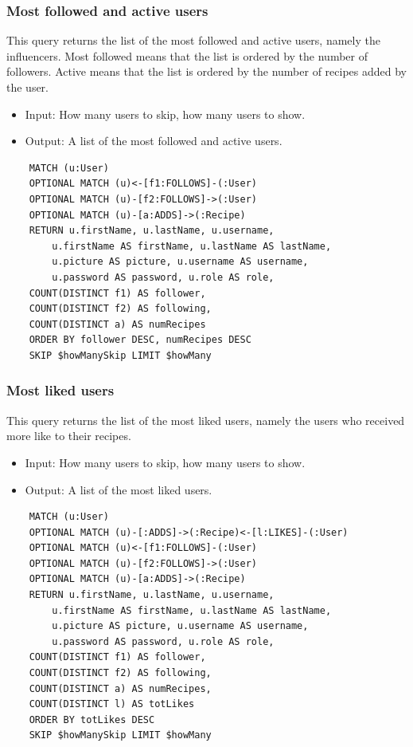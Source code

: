 \documentclass[a4paper]{report}
\begin{document}
\subsubsection{Most followed and active users}
This query returns the list of the most followed and active users, namely the influencers.
Most followed means that the list is ordered by the number of followers.
Active means that the list is ordered by the number of recipes added by the user.
\begin{itemize}
	\item Input: How many users to skip, how many users to show.
	\item Output: A list of the most followed and active users.
\end{itemize}
\lstset{ language=java}
\begin{lstlisting}
	MATCH (u:User)
	OPTIONAL MATCH (u)<-[f1:FOLLOWS]-(:User)
	OPTIONAL MATCH (u)-[f2:FOLLOWS]->(:User)
	OPTIONAL MATCH (u)-[a:ADDS]->(:Recipe)
	RETURN u.firstName, u.lastName, u.username, 
		u.firstName AS firstName, u.lastName AS lastName, 
		u.picture AS picture, u.username AS username,
		u.password AS password, u.role AS role,
	COUNT(DISTINCT f1) AS follower,
	COUNT(DISTINCT f2) AS following,
	COUNT(DISTINCT a) AS numRecipes
	ORDER BY follower DESC, numRecipes DESC
	SKIP $howManySkip LIMIT $howMany
\end{lstlisting}
\subsubsection{Most liked users}
This query returns the list of the most liked users, namely the users who received more like to their recipes.
\begin{itemize}
	\item Input: How many users to skip, how many users to show.
	\item Output: A list of the most liked users.
\end{itemize}
\lstset{ language=java}
\begin{lstlisting}
	MATCH (u:User)
	OPTIONAL MATCH (u)-[:ADDS]->(:Recipe)<-[l:LIKES]-(:User)
	OPTIONAL MATCH (u)<-[f1:FOLLOWS]-(:User)
	OPTIONAL MATCH (u)-[f2:FOLLOWS]->(:User) 
	OPTIONAL MATCH (u)-[a:ADDS]->(:Recipe)
	RETURN u.firstName, u.lastName, u.username, 
		u.firstName AS firstName, u.lastName AS lastName, 
		u.picture AS picture, u.username AS username, 
		u.password AS password, u.role AS role, 
	COUNT(DISTINCT f1) AS follower, 
	COUNT(DISTINCT f2) AS following, 
	COUNT(DISTINCT a) AS numRecipes, 
	COUNT(DISTINCT l) AS totLikes 
	ORDER BY totLikes DESC 
	SKIP $howManySkip LIMIT $howMany
\end{lstlisting}
\end{document}
